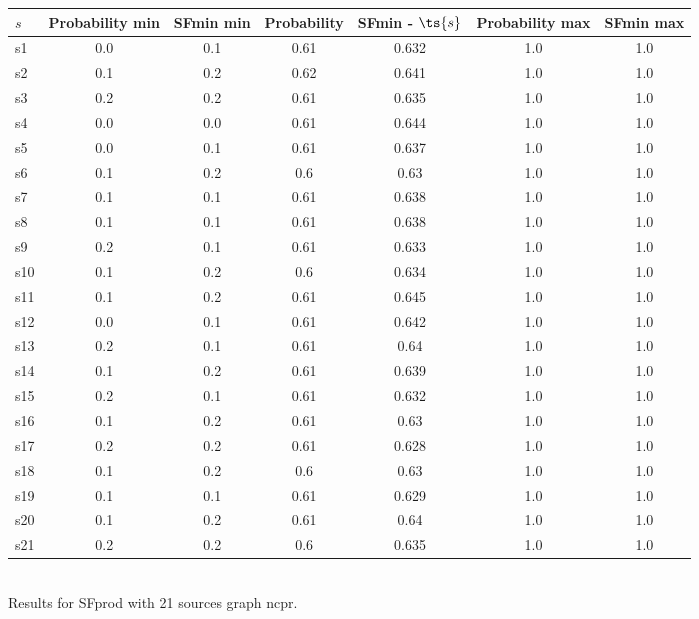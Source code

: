 \documentclass{article}
\begin{document}
\noindent\begin{tabular}{|l|c|c|c|c|c|c|}
\hline
$s$& Probability min & SFmin min & Probability & SFmin - $\ts{s}$ & Probability max & SFmin max\\
\hline
s1 &0.0 & 0.1 & 0.61 & 0.632 & 1.0 & 1.0\\
\hline
s2 &0.1 & 0.2 & 0.62 & 0.641 & 1.0 & 1.0\\
\hline
s3 &0.2 & 0.2 & 0.61 & 0.635 & 1.0 & 1.0\\
\hline
s4 &0.0 & 0.0 & 0.61 & 0.644 & 1.0 & 1.0\\
\hline
s5 &0.0 & 0.1 & 0.61 & 0.637 & 1.0 & 1.0\\
\hline
s6 &0.1 & 0.2 & 0.6 & 0.63 & 1.0 & 1.0\\
\hline
s7 &0.1 & 0.1 & 0.61 & 0.638 & 1.0 & 1.0\\
\hline
s8 &0.1 & 0.1 & 0.61 & 0.638 & 1.0 & 1.0\\
\hline
s9 &0.2 & 0.1 & 0.61 & 0.633 & 1.0 & 1.0\\
\hline
s10 &0.1 & 0.2 & 0.6 & 0.634 & 1.0 & 1.0\\
\hline
s11 &0.1 & 0.2 & 0.61 & 0.645 & 1.0 & 1.0\\
\hline
s12 &0.0 & 0.1 & 0.61 & 0.642 & 1.0 & 1.0\\
\hline
s13 &0.2 & 0.1 & 0.61 & 0.64 & 1.0 & 1.0\\
\hline
s14 &0.1 & 0.2 & 0.61 & 0.639 & 1.0 & 1.0\\
\hline
s15 &0.2 & 0.1 & 0.61 & 0.632 & 1.0 & 1.0\\
\hline
s16 &0.1 & 0.2 & 0.61 & 0.63 & 1.0 & 1.0\\
\hline
s17 &0.2 & 0.2 & 0.61 & 0.628 & 1.0 & 1.0\\
\hline
s18 &0.1 & 0.2 & 0.6 & 0.63 & 1.0 & 1.0\\
\hline
s19 &0.1 & 0.1 & 0.61 & 0.629 & 1.0 & 1.0\\
\hline
s20 &0.1 & 0.2 & 0.61 & 0.64 & 1.0 & 1.0\\
\hline
s21 &0.2 & 0.2 & 0.6 & 0.635 & 1.0 & 1.0\\
\hline
\end{tabular}\\

\noindent Results for SFprod with 21 sources graph ncpr.
\end{document}
